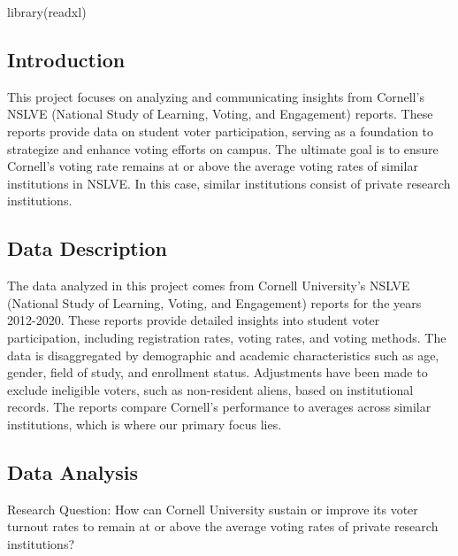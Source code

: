 \documentclass[
  letterpaper,
  DIV=11,
  numbers=noendperiod]{scrartcl}
\newenvironment{Shaded}{\begin{snugshade}}{\end{snugshade}}
\newcommand{\FunctionTok}[1]{\textcolor[rgb]{0.28,0.35,0.67}{#1}}
\newcommand{\NormalTok}[1]{\textcolor[rgb]{0.00,0.23,0.31}{#1}}
\begin{document}
\begin{Shaded}
\begin{Highlighting}[]
\FunctionTok{library}\NormalTok{(readxl)}
\end{Highlighting}
\end{Shaded}

\subsection{Introduction}\label{introduction}

This project focuses on analyzing and communicating insights from
Cornell's NSLVE (National Study of Learning, Voting, and Engagement)
reports. These reports provide data on student voter participation,
serving as a foundation to strategize and enhance voting efforts on
campus. The ultimate goal is to ensure Cornell's voting rate remains at
or above the average voting rates of similar institutions in NSLVE. In
this case, similar institutions consist of private research
institutions.

\subsection{Data Description}\label{data-description}

The data analyzed in this project comes from Cornell University's NSLVE
(National Study of Learning, Voting, and Engagement) reports for the
years 2012-2020. These reports provide detailed insights into student
voter participation, including registration rates, voting rates, and
voting methods. The data is disaggregated by demographic and academic
characteristics such as age, gender, field of study, and enrollment
status. Adjustments have been made to exclude ineligible voters, such as
non-resident aliens, based on institutional records. The reports compare
Cornell's performance to averages across similar institutions, which is
where our primary focus lies.

\subsection{Data Analysis}\label{data-analysis}

Research Question: How can Cornell University sustain or improve its
voter turnout rates to remain at or above the average voting rates of
private research institutions?
\end{document}
